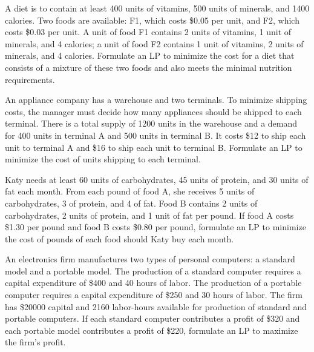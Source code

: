 \begin{Ejer} A diet is to contain at least 400 units of vitamins, 500 units of minerals, and 1400 calories. Two foods are available: F1, which costs \$0.05 per unit, and F2, which costs \$0.03 per unit. A unit of food F1 contains 2 units of vitamins, 1 unit of minerals, and 4 calories; a unit of food F2 contains 1 unit of vitamins, 2 units of minerals, and 4 calories. Formulate an LP to minimize the cost for a diet that consists of a mixture of these two foods and also meets the minimal nutrition requirements.

\end{Ejer}

\begin{Ejer} An appliance company has a warehouse and two terminals. To minimize shipping costs, the manager must decide how many appliances should be shipped to each terminal. There is a total supply of 1200 units in the warehouse and a demand for 400 units in terminal A and 500 units in terminal B. It costs \$12 to ship each unit to terminal A and \$16 to ship each unit to terminal B. Formulate an LP to minimize the cost of units shipping to each terminal.

\end{Ejer}

\begin{Ejer} Katy needs at least 60 units of carbohydrates, 45 units of protein, and 30 units of fat each month. From each pound of food A, she receives 5 units of carbohydrates, 3 of protein, and 4 of fat. Food B contains 2 units of carbohydrates, 2 units of protein, and 1 unit of fat per pound. If food A costs \$1.30 per pound and food B costs \$0.80 per pound, formulate an LP to minimize the cost of pounds of each food should Katy buy each month.

\end{Ejer}

\begin{Ejer} An electronics firm manufactures two types of personal computers: a standard model and a portable model. The production of a standard computer requires a capital expenditure of \$400 and 40 hours of labor. The production of a portable computer requires a capital expenditure of \$250 and 30 hours of labor. The firm has \$20000 capital and 2160 labor-hours available for production of standard and portable computers. If each standard computer contributes a profit of \$320 and each portable model contributes a profit of \$220, formulate an LP to maximize the firm's profit.

\end{Ejer}

